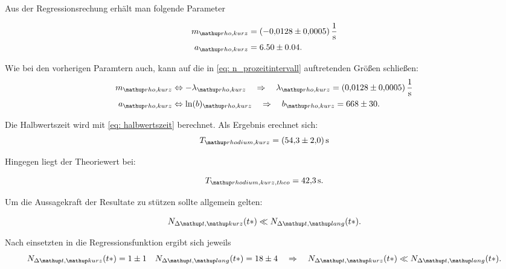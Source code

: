 Aus der Regressionsrechung erhält man folgende Parameter

\begin{align}
  \label{eq:parameter_rhodium_kurz}
  \begin{aligned}
    m\ua{rho,kurz}&=\SI{-0.0128\pm0.0005}{\per\second}\\
    a\ua{rho,kurz}&=6.50\pm0.04.
  \end{aligned}
\end{align}

Wie bei den vorherigen Paramtern auch, kann auf die in \eqref{eq: n_prozeitintervall} auftretenden Größen
schließen:
\begin{align}
  \label{eq:parameter_rhodium_kurz_lambda}
  \begin{aligned}
    m\ua{rho,kurz}&\Leftrightarrow -\lambda\ua{rho,kurz} \quad \Rightarrow \quad \lambda\ua{rho,kurz}=\SI{0.0128\pm0.0005}{\per\second}\\
    a\ua{rho,kurz}&\Leftrightarrow \ln(b)\ua{rho,kurz} \quad \Rightarrow \quad b\ua{rho,kurz} =668\pm 30.
  \end{aligned}
\end{align}

Die Halbwertszeit wird mit \eqref{eq: halbwertszeit} berechnet.
Als Ergebnis erechnet sich:
\begin{equation}
  \label{eq:halbwertzeit_rhodium_kurz}
  T\ua{rhodium, kurz}=\SI{54.3\pm2.0 }{\second}
\end{equation}

Hingegen liegt der Theoriewert\cite{rhodium_kurz_halb} bei:

\begin{equation}
  \label{eq:halbwertzeit_rhodium_kurz_theo}
  T\ua{rhodium, kurz, theo}=\SI{42.3}{\second}.
\end{equation}



Um die Aussagekraft der Resultate zu stützen sollte allgemein gelten:

\begin{equation*}
  N_{\Delta \map{t}, \map{kurz}}(t*)\ll N_{\Delta \map{t}, \map{lang}}(t*).
\end{equation*}

Nach einsetzten in die Regressionsfunktion ergibt sich jeweils
\begin{equation*}
    N_{\Delta \map{t}, \map{kurz}}(t*)= 1\pm1 \quad  N_{\Delta \map{t}, \map{lang}}(t*)= 18\pm 4 \quad \Rightarrow \quad N_{\Delta \map{t}, \map{kurz}}(t*)\ll N_{\Delta \map{t}, \map{lang}}(t*).
\end{equation*}

